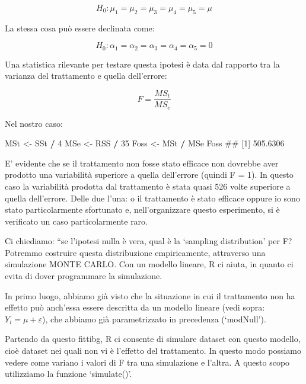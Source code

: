 \documentclass[a4paper,12pt,oneside]{book}
\newenvironment{Shaded}{\begin{snugshade}}{\end{snugshade}}
\newcommand{\DecValTok}[1]{\textcolor[rgb]{0.00,0.00,0.81}{#1}}
\newcommand{\StringTok}[1]{\textcolor[rgb]{0.31,0.60,0.02}{#1}}
\newcommand{\OperatorTok}[1]{\textcolor[rgb]{0.81,0.36,0.00}{\textbf{#1}}}
\newcommand{\NormalTok}[1]{#1}
\theoremstyle{definition}
\theoremstyle{definition}
\theoremstyle{definition}
\theoremstyle{remark}
\begin{document}
\[H_0: \mu_1 = \mu_2 = \mu_3 = \mu_4 = \mu_5 = \mu\]

La stessa cosa può essere declinata come:

\[H_0: \alpha_1 = \alpha_2 = \alpha_3 = \alpha_4 = \alpha_5 = 0\]

Una statistica rilevante per testare questa ipotesi è data dal rapporto
tra la varianza del trattamento e quella dell'errore:

\[F = \frac{MS_t}{MS_e} \]

Nel nostro caso:

\begin{Shaded}
\begin{Highlighting}[]
\NormalTok{MSt <-}\StringTok{ }\NormalTok{SSt }\OperatorTok{/}\StringTok{ }\DecValTok{4}
\NormalTok{MSe <-}\StringTok{ }\NormalTok{RSS }\OperatorTok{/}\StringTok{ }\DecValTok{35}
\NormalTok{Foss <-}\StringTok{ }\NormalTok{MSt }\OperatorTok{/}\StringTok{ }\NormalTok{MSe}
\NormalTok{Foss}
\NormalTok{## [1] 505.6306}
\end{Highlighting}
\end{Shaded}

E' evidente che se il trattamento non fosse stato efficace non dovrebbe
aver prodotto una variabilità superiore a quella dell'errore (quindi F =
1). In questo caso la variabilità prodotta dal trattamento è stata quasi
526 volte superiore a quella dell'errore. Delle due l'una: o il
trattamento è stato efficace oppure io sono stato particolarmente
sfortunato e, nell'organizzare questo esperimento, si è verificato un
caso particolarmente raro.

Ci chiediamo: ``se l'ipotesi nulla è vera, qual è la `sampling
distribution' per F? Potremmo costruire questa distribuzione
empiricamente, attraverso una simulazione MONTE CARLO. Con un modello
lineare, R ci aiuta, in quanto ci evita di dover programmare la
simulazione.

In primo luogo, abbiamo già visto che la situazione in cui il
trattamento non ha effetto può anch'essa essere descritta da un modello
lineare (vedi sopra: \(Y_i = \mu + \varepsilon\)), che abbiamo già
parametrizzato in precedenza (`modNull').

Partendo da questo fittibg, R ci consente di simulare dataset con questo
modello, cioè dataset nei quali non vi è l'effetto del trattamento. In
questo modo possiamo vedere come variano i valori di F tra una
simulazione e l'altra. A questo scopo utilizziamo la funzione
`simulate()'.
\end{document}
